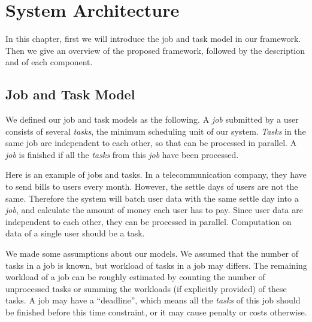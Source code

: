 \chapter{System Architecture}\label{chap:arch}

In this chapter, first we will introduce the job and task model in our
framework.
Then we give an overview of the proposed framework, followed by the
description and of each component.


\section{Job and Task Model}

We defined our job and task models as the following.
A \emph{job} submitted by a user consists of several \emph{tasks}, the
minimum scheduling unit of our system.
\emph{Tasks} in the same job are independent to each other, so that can
be processed in parallel.
A \emph{job} is finished if all the \emph{tasks} from this \emph{job} have
been processed.

Here is an example of jobs and tasks.
In a telecommunication company, they have to send bills to users every
month.
However, the settle days of users are not the same.
Therefore the system will batch user data with the same settle day into
a \emph{job}, and calculate the amount of money each user has to pay.
Since user data are independent to each other, they can be processed in
parallel.
Computation on data of a single user should be a task.

We made some assumptions about our models.
We assumed that the number of tasks in a job is known, but workload of
tasks in a job may differs.
The remaining workload of a job can be roughly estimated by counting the
number of unprocessed tasks or summing the workloads (if explicitly
provided) of these tasks.
A job may have a ``deadline'', which means all the \emph{tasks} of this
job should be finished before this time constraint, or it may cause
penalty or costs otherwise.




